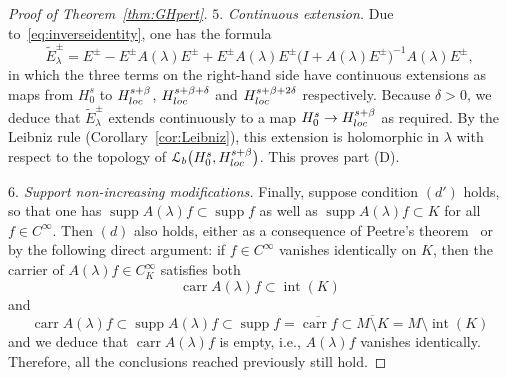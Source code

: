 \documentclass[11pt]{article}
\numberwithin{equation}{section}
\numberwithin{equation}{section}
\newcommand{\LL}{{\mathcal L}}
\DeclareMathOperator{\carr}{carr}
\DeclareMathOperator{\supp}{supp}
\DeclareMathOperator{\inte}{int}
\newcommand{\loc}{{\rm loc}}
\begin{document}
\begin{proof}[Proof of Theorem~\ref{thm:GHpert}]
 	\emph{$5.$ Continuous extension.} Due to~\eqref{eq:inverseidentity}, one has the formula
 	\begin{equation*}
 		\tilde{E}_\lambda^\pm = E^\pm - E^\pm A(\lambda)E^\pm + E^\pm A(\lambda)E^\pm \big(I+ A(\lambda)E^\pm\big)^{-1}A(\lambda)E^\pm,
 	\end{equation*}
 	in which the three terms on the right-hand side have continuous
 	extensions as maps from $H^s_0$ to $H^{s+\beta}_\loc$, $H^{s+\beta+\delta}_\loc$ and $H^{s+\beta+2\delta}_\loc$ respectively. Because $\delta>0$, we deduce that $\tilde{E}^\pm_\lambda$
 	extends continuously to a map $H^s_0\to H_\loc^{s+\beta}$ as required.
 	By the Leibniz rule (Corollary~\ref{cor:Leibniz}), this extension is holomorphic in $\lambda$ with respect to the topology of $\LL_b\big(H^s_0,H_\loc^{s+\beta}\big)$.
 	This proves part (D).
 	
 	
 	\emph{$6.$ Support non-increasing modifications.} Finally, suppose condition $(d')$ holds, so that one has $\supp A(\lambda)f\subset \supp f$ as well as
 	$\supp A(\lambda)f\subset K$ for all $f\in C^\infty$. Then $(d)$ also holds,
 	either as a consequence of Peetre's theorem~\cite{Peetre:1960} or by the
 	following direct argument:
 	if $f\in C^\infty$ vanishes identically on $K$, then the carrier of $A(\lambda)f\in C^\infty_K$ satisfies
 	both
 	\begin{equation*}
 		\carr A(\lambda)f \subset \inte(K)
 	\end{equation*}
 	and
 	\begin{equation*}
 		\carr A(\lambda)f\subset \supp A(\lambda)f\subset \supp f=\overline{\carr f}\subset \overline{M\setminus K} = M\setminus \inte(K)
 	\end{equation*}
 	and we deduce that $\carr A(\lambda)f$ is empty, i.e., $A(\lambda)f$ vanishes identically. Therefore, all the conclusions reached previously still hold.
 	

\end{proof}
\end{document}
